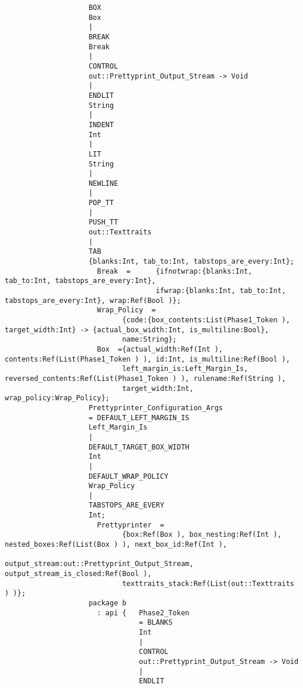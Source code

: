 \begin{verbatim}
                    BOX
                    Box
                    |
                    BREAK
                    Break
                    |
                    CONTROL
                    out::Prettyprint_Output_Stream -> Void
                    |
                    ENDLIT
                    String
                    |
                    INDENT
                    Int
                    |
                    LIT
                    String
                    |
                    NEWLINE
                    |
                    POP_TT
                    |
                    PUSH_TT
                    out::Texttraits
                    |
                    TAB
                    {blanks:Int, tab_to:Int, tabstops_are_every:Int};
                      Break  =      {ifnotwrap:{blanks:Int, tab_to:Int, tabstops_are_every:Int},
                                    ifwrap:{blanks:Int, tab_to:Int, tabstops_are_every:Int}, wrap:Ref(Bool )};
                      Wrap_Policy  =
                            {code:{box_contents:List(Phase1_Token ), target_width:Int} -> {actual_box_width:Int, is_multiline:Bool},
                            name:String};
                      Box  ={actual_width:Ref(Int ), contents:Ref(List(Phase1_Token ) ), id:Int, is_multiline:Ref(Bool ),
                            left_margin_is:Left_Margin_Is, reversed_contents:Ref(List(Phase1_Token ) ), rulename:Ref(String ),
                            target_width:Int, wrap_policy:Wrap_Policy};
                    Prettyprinter_Configuration_Args
                    = DEFAULT_LEFT_MARGIN_IS
                    Left_Margin_Is
                    |
                    DEFAULT_TARGET_BOX_WIDTH
                    Int
                    |
                    DEFAULT_WRAP_POLICY
                    Wrap_Policy
                    |
                    TABSTOPS_ARE_EVERY
                    Int;
                      Prettyprinter  =
                            {box:Ref(Box ), box_nesting:Ref(Int ), nested_boxes:Ref(List(Box ) ), next_box_id:Ref(Int ),
                            output_stream:out::Prettyprint_Output_Stream, output_stream_is_closed:Ref(Bool ),
                            texttraits_stack:Ref(List(out::Texttraits ) )};
                    package b
                      : api {   Phase2_Token
                                = BLANKS
                                Int
                                |
                                CONTROL
                                out::Prettyprint_Output_Stream -> Void
                                |
                                ENDLIT

\end{verbatim}

